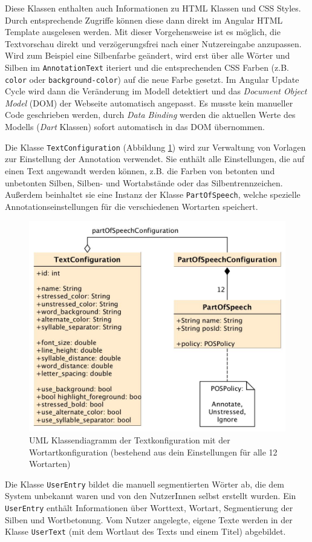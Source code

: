 Diese Klassen enthalten auch Informationen zu HTML Klassen und CSS Styles. Durch entsprechende Zugriffe können diese dann direkt im Angular HTML Template ausgelesen werden. Mit dieser Vorgehensweise ist es möglich, die Textvorschau direkt und verzögerungsfrei nach einer Nutzereingabe anzupassen. Wird zum Beispiel eine Silbenfarbe geändert, wird erst über alle Wörter und Silben im \texttt{AnnotationText} iteriert und die entsprechenden CSS Farben (z.B. \texttt{color} oder \texttt{background-color}) auf die neue Farbe gesetzt. Im Angular Update Cycle wird dann die Veränderung im Modell detektiert und das \textit{Document Object Model} (DOM) der Webseite automatisch angepasst. Es musste kein manueller Code geschrieben werden, durch \textit{Data Binding} werden die aktuellen Werte des Modells (\textit{Dart} Klassen) sofort automatisch in das DOM übernommen.

Die Klasse \texttt{TextConfiguration} (Abbildung \ref{fig:textconf}) wird zur Verwaltung von Vorlagen zur Einstellung der Annotation verwendet. Sie enthält alle Einstellungen, die auf einen Text angewandt werden können, z.B. die Farben von betonten und unbetonten Silben, Silben- und Wortabstände oder das Silbentrennzeichen. Außerdem beinhaltet sie eine Instanz der Klasse \texttt{PartOfSpeech}, welche spezielle Annotationseinstellungen für die verschiedenen Wortarten speichert.

\begin{figure}[h!]
	\centering
	\includegraphics[width=.5\linewidth]{figures/frontend/uml-textconfig}
	\caption{UML Klassendiagramm der Textkonfiguration mit der Wortartkonfiguration (bestehend aus dein Einstellungen für alle 12 Wortarten)}
	\label{fig:textconf}
\end{figure}

Die Klasse \texttt{UserEntry} bildet die manuell segmentierten Wörter ab, die dem System unbekannt waren und von den NutzerInnen selbst erstellt wurden. Ein \texttt{UserEntry} enthält Informationen über Worttext, Wortart, Segmentierung der Silben und Wortbetonung. Vom Nutzer angelegte, eigene Texte werden in der Klasse \texttt{UserText} (mit dem Wortlaut des Texts und einem Titel) abgebildet.


